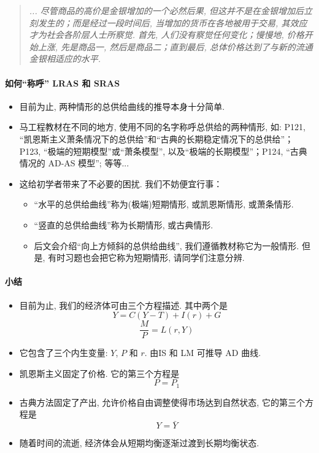 \documentclass[10pt]{ctexart}
\begin{document}
\begin{quote}
\it ...
尽管商品的高价是金银增加的一个必然后果, 但这并不是在金银增加后立刻发生的；而是经过一段时间后, 当增加的货币在各地被用于交易, 其效应才为社会各阶层人士所察觉. 首先, 人们没有察觉任何变化；慢慢地, 价格开始上涨, 先是商品一, 然后是商品二；直到最后, 总体价格达到了与新的流通金银相适应的水平. 
\end{quote}

\paragraph{如何``称呼'' LRAS 和 SRAS}
\begin{itemize}
\item 
  目前为止, 两种情形的总供给曲线的推导本身十分简单.
\item
  马工程教材在不同的地方, 使用不同的名字称呼总供给的两种情形, 如: P121,
  ``凯恩斯主义萧条情况下的总供给''和``古典的长期稳定情况下的总供给''；P123,
  ``极端的短期模型''或``萧条模型'', 以及``极端的长期模型''；P124,
  ``古典情况的 AD-AS 模型''; 等等...
\item  
  这给初学者带来了不必要的困扰. 我们不妨便宜行事：
  \begin{itemize}
\item
  ``水平的总供给曲线''称为(极端)短期情形, 或凯恩斯情形, 或萧条情形.
\item
  ``竖直的总供给曲线''称为长期情形, 或古典情形.
\item
  后文会介绍``向上方倾斜的总供给曲线'', 
  我们遵循教材称它为一般情形. 但是, 有时习题也会把它称为短期情形, 请同学们注意分辨.
  \end{itemize}
\end{itemize}


\hypertarget{header-n2318}{%
\paragraph{小结}\label{header-n2318}}

\begin{itemize}
\item
  目前为止, 我们的经济体可由三个方程描述. 其中两个是
  \[Y = C(Y-T) + I(r) + G \tag{IS}\]
  \[\frac{M}{P} = L(r, Y) \tag{LM}\]
\item
  它包含了三个内生变量: \(Y\),  \(P\) 和 \(r\). 由IS 和 LM 可推导 AD 曲线. 
\item
  凯恩斯主义固定了价格. 它的第三个方程是
  \[P = P_1  \tag{短期均衡条件}\]
\item
  古典方法固定了产出, 允许价格自由调整使得市场达到自然状态, 它的第三个方程是
  \[Y=\bar Y \tag{长期均衡条件} \]
\item
  随着时间的流逝, 经济体会从短期均衡逐渐过渡到长期均衡状态. 
\end{itemize}
\end{document}
